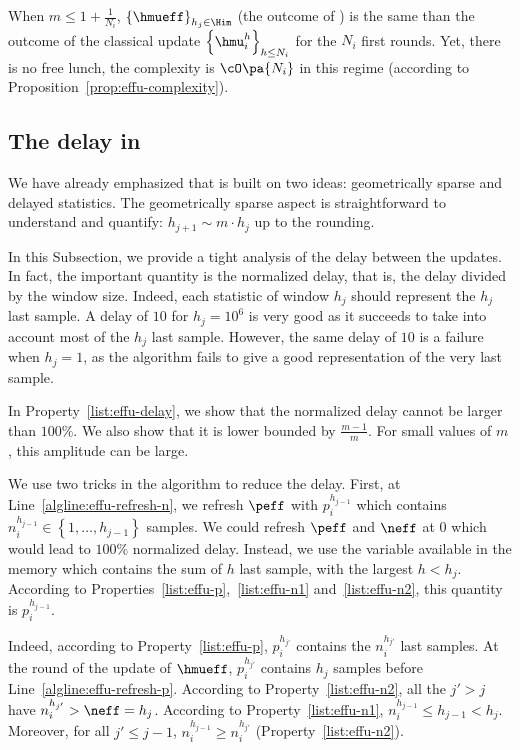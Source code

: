 \begin{remark}
When $m\leq 1 + \frac{1}{N_i}$, $\left\{\hmueff\right\}_{h_j \in \Him}$ (the outcome of \EFFU) is the same than the outcome of the classical update $\left\{\hmu_i^h\right\}_{h \leq N_i}$ for the $N_i$ first rounds. Yet, there is no free lunch, the complexity is $\cO\pa{N_i}$ in this regime (according to Proposition~\ref{prop:effu-complexity}).
\end{remark}



\subsection{The delay in {\EFF}}
We have already emphasized that \EFFU is built on two ideas: geometrically sparse and delayed statistics. The geometrically sparse aspect is straightforward to understand and quantify: $h_{j+1} \sim m \cdot h_j$ up to the rounding.

In this Subsection, we provide a tight analysis of the delay between the updates. In fact, the important quantity is the normalized delay, that is, the delay divided by the window size. Indeed, each statistic of window $h_j$ should represent the $h_j$ last sample. A delay of $10$ for $h_j = 10^6$ is very good as it succeeds to take into account most of the $h_j$ last sample. However, the same delay of $10$ is a failure when $h_j = 1$, as the algorithm fails to give a good representation of the very last sample.

In Property~\ref{list:effu-delay}, we show that the normalized delay cannot be larger than $100\%$. We also show that it is lower bounded by $\frac{m-1}{m}$. For small values of $m$, this amplitude can be large. 

We use two tricks in the algorithm to reduce the delay. First, at Line~\ref{algline:effu-refresh-n}, we refresh $\peff$ with $p_i^{h_{j-1}}$ which contains $n_i^{h_{j-1}} \in \left\{ 1, \dots, h_{j-1}\right\}$ samples. We could refresh $\peff$ and $\neff$ at $0$ which would lead to $100\%$ normalized delay. Instead, we use the variable available in the memory which contains the sum of $h$ last sample, with the largest $h< h_j$.  According to Properties~\ref{list:effu-p},~\ref{list:effu-n1} and~\ref{list:effu-n2}, this quantity is $p_i^{h_{j-1}}$. 

Indeed, according to Property~\ref{list:effu-p}, $p_i^{h_{j'}}$ contains the $n_i^{h_{j'}}$ last samples. At the round of the update of $\hmueff$,  $p_i^{h_{j'}}$ contains $h_j$ samples before Line~\ref{algline:effu-refresh-p}. According to Property~\ref{list:effu-n2}, all the $j'>j$ have  $n_i^{h_{j'}}>\neff = h_j$. According to Property~\ref{list:effu-n1}, $n_i^{h_{j-1}}\leq h_{j-1} < h_j$.  Moreover, for all $j' \leq j-1$, $n_i^{h_{j-1}} \geq n_i^{h_{j'}}$ (Property~\ref{list:effu-n2}).

